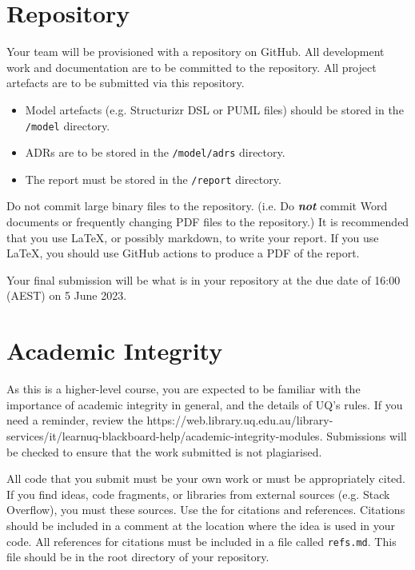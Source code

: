 \documentclass{csse4400}
\begin{document}
\section{Repository}
Your team will be provisioned with a repository on GitHub.
All development work and documentation are to be committed to the repository.
All project artefacts are to be submitted via this repository.

\begin{itemize}
    \item Model artefacts (e.g. Structurizr DSL or PUML files) should be stored in the \texttt{/model} directory.
    \item ADRs are to be stored in the \texttt{/model/adrs} directory.
    \item The report must be stored in the \texttt{/report} directory.
\end{itemize}

Do not commit large binary files to the repository.
(i.e. Do \textbf{\emph{not}} commit Word documents or frequently changing PDF files to the repository.)
It is recommended that you use LaTeX, or possibly markdown, to write your report.
If you use LaTeX, you should use GitHub actions to produce a PDF of the report.

Your final submission will be what is in your repository at the due date of 16:00 (AEST) on 5 June 2023.


\section{Academic Integrity}
As this is a higher-level course, you are expected to be familiar with the importance of academic integrity in general, and the details of UQ's rules.
If you need a reminder, review the 
{https://web.library.uq.edu.au/library-services/it/learnuq-blackboard-help/academic-integrity-modules}.
Submissions will be checked to ensure that the work submitted is not plagiarised.

All code that you submit must be your own work or must be appropriately cited.
If you find ideas, code fragments, or libraries from external sources (e.g. Stack Overflow), you must  these sources.
Use the  for citations and references.
Citations should be included in a comment at the location where the idea is used in your code.
All references for citations must be included in a file called \texttt{refs.md}.
This file should be in the root directory of your repository.
\end{document}
